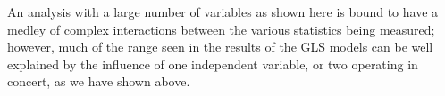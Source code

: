 
An analysis with a large number of variables as shown here is bound to have a medley of complex interactions between the various statistics being measured; however, much of the range seen in the results of the GLS models can be well explained by the influence of one independent variable, or two operating in concert, as we have shown above.


